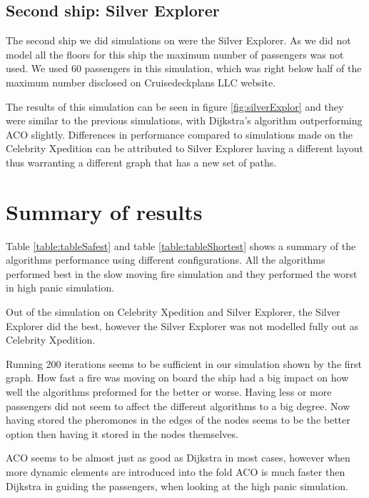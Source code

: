 \subsection{Second ship: Silver Explorer}
The second ship we did simulations on were the Silver Explorer. As we did not model all the floors for this ship the maximum number of passengers was not used. We used 60 passengers in this simulation, which was right below half of the maximum number disclosed on Cruisedeckplans LLC website\cite{cruseships}.

The results of this simulation can be seen in figure \ref{fig:silverExplor} and they were similar to the previous simulations, with Dijkstra's algorithm outperforming ACO slightly. Differences in performance compared to simulations made on the Celebrity Xpedition can be attributed to Silver Explorer having a different layout thus warranting a different graph that has a new set of paths.

\section{Summary of results}

Table \ref{table:tableSafest} and table \ref{table:tableShortest} shows a summary of the algorithms performance using different configurations. All the algorithms performed best in the slow moving fire simulation and they performed the worst in high panic simulation.

 Out of the simulation on Celebrity Xpedition and Silver Explorer, the Silver Explorer did the best, however the Silver Explorer was not modelled fully out as Celebrity Xpedition.

Running 200 iterations seems to be sufficient in our simulation shown by the first graph. How fast a fire was moving on board the ship had a big impact on how well the algorithms preformed for the better or worse. Having less or more passengers did not seem to affect the different algorithms to a big degree. Now having stored the pheromones in the edges of the nodes seems to be the better option then having it stored in the nodes themselves.

ACO seems to be almost just as good as Dijkstra in most cases, however when more dynamic elements are introduced into the fold ACO is much faster then Dijkstra in guiding the passengers, when looking at the high panic simulation.


